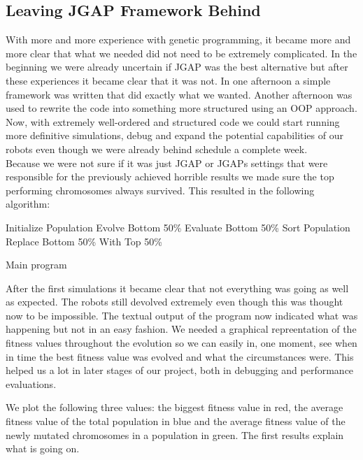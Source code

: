 \documentclass[a4paper,10pt]{article}
\begin{document}
\subsection{Leaving JGAP Framework Behind}
With more and more experience with genetic programming, it became more and more clear that what we needed did not need to be extremely complicated. In the beginning 
we were already uncertain if JGAP was the best alternative but after these experiences it became clear that it was not. In one afternoon a simple framework was written
that did exactly what we wanted. Another afternoon was used to rewrite the code into something more structured using an OOP approach. Now, with extremely well-ordered and
structured code we could start running more definitive simulations, debug and expand the potential capabilities of our robots even though we were already behind schedule
a complete week. \\

Because we were not sure if it was just JGAP or JGAPs settings that were responsible for the previously achieved horrible results we made sure the top performing 
chromosomes always survived. This resulted in the following algorithm:

\begin{algorithm}
\begin{algorithmic}
\STATE Initialize Population
    \STATE Evolve Bottom 50\%
    \STATE Evaluate Bottom 50\%
    \STATE Sort Population 
    \STATE Replace Bottom 50\% With Top 50\%
\ENDWHILE
\end{algorithmic}
\caption{Main program}
\label{alg:main}
\end{algorithm}



After the first simulations it became clear that not everything was going as well as expected. The robots still devolved extremely even though this was thought now to be 
impossible. The textual output of the program now indicated what was happening but not in an easy fashion. We needed a graphical repreentation of the fitness values 
throughout the evolution so we can easily in, one moment, see when in time the best fitness value was evolved and what the circumstances were. This helped us a lot in later
stages of our project, both in debugging and performance evaluations.

We plot the following three values: the biggest fitness value in red, the average fitness value of the total population in blue and the average fitness value of the 
newly mutated chromosomes in a population in green. The first results explain what is going on.
  
\end{document}
